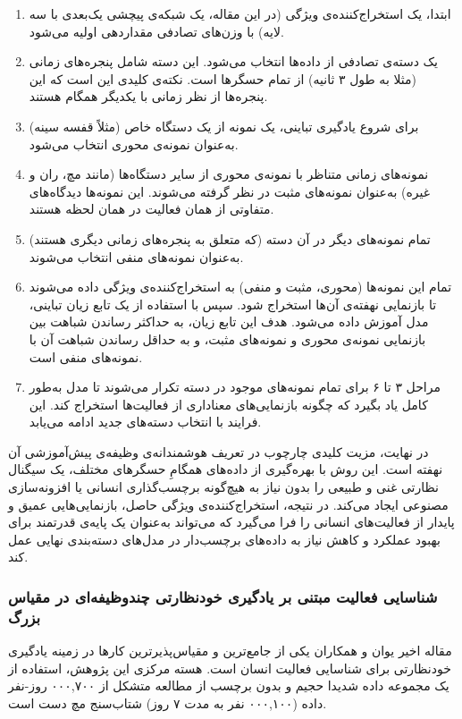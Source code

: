 \begin{enumerate}
\item ابتدا، یک استخراج‌کننده‌ی ویژگی (در این مقاله، یک شبکه‌ی پیچشی یک‌بعدی با سه لایه) با وزن‌های تصادفی مقداردهی اولیه می‌شود.
\item یک دسته‌ی تصادفی از داده‌ها انتخاب می‌شود. این دسته شامل پنجره‌های زمانی (مثلا به طول ۳ ثانیه) از تمام حسگرها است. نکته‌ی کلیدی این است که این پنجره‌ها از نظر زمانی با یکدیگر همگام هستند.
\item برای شروع یادگیری تباینی، یک نمونه از یک دستگاه خاص (مثلاً قفسه سینه) به‌عنوان نمونه‌ی محوری  انتخاب می‌شود.
\item نمونه‌های زمانی متناظر با نمونه‌ی محوری از سایر دستگاه‌ها (مانند مچ، ران و غیره) به‌عنوان نمونه‌های مثبت در نظر گرفته می‌شوند. این نمونه‌ها دیدگاه‌های متفاوتی از همان فعالیت در همان لحظه هستند.
\item تمام نمونه‌های دیگر در آن دسته (که متعلق به پنجره‌های زمانی دیگری هستند) به‌عنوان نمونه‌های منفی انتخاب می‌شوند.
\item تمام این نمونه‌ها (محوری، مثبت و منفی) به استخراج‌کننده‌ی ویژگی داده می‌شوند تا بازنمایی نهفته‌ی آن‌ها استخراج شود. سپس با استفاده از یک تابع زیان تباینی، مدل آموزش داده می‌شود. هدف این تابع زیان، به حداکثر رساندن شباهت بین بازنمایی نمونه‌ی محوری و نمونه‌های مثبت، و به حداقل رساندن شباهت آن با نمونه‌های منفی است.
\item مراحل ۳ تا ۶ برای تمام نمونه‌های موجود در دسته تکرار می‌شوند تا مدل به‌طور کامل یاد بگیرد که چگونه بازنمایی‌های معناداری از فعالیت‌ها استخراج کند. این فرایند با انتخاب دسته‌های جدید ادامه می‌یابد.
\end{enumerate}

در نهایت، مزیت کلیدی چارچوب  در تعریف هوشمندانه‌ی وظیفه‌ی پیش‌آموزشی آن نهفته است. این روش با بهره‌گیری از داده‌های همگامِ حسگرهای مختلف، یک سیگنال نظارتی غنی و طبیعی را بدون نیاز به هیچ‌گونه برچسب‌گذاری انسانی یا افزونه‌سازی مصنوعی ایجاد می‌کند. در نتیجه، استخراج‌کننده‌ی ویژگی حاصل، بازنمایی‌هایی عمیق و پایدار از فعالیت‌های انسانی را فرا می‌گیرد که می‌تواند به‌عنوان یک پایه‌ی قدرتمند برای بهبود عملکرد و کاهش نیاز به داده‌های برچسب‌دار در مدل‌های دسته‌بندی نهایی عمل کند.

\subsubsection{شناسایی فعالیت مبتنی بر یادگیری خودنظارتی چندوظیفه‌ای در مقیاس بزرگ}

مقاله اخیر یوان و همکاران \cite{yuan2024self} یکی از جامع‌ترین و مقیاس‌پذیرترین کارها در زمینه یادگیری خودنظارتی برای شناسایی فعالیت انسان است. هسته مرکزی این پژوهش، استفاده از یک مجموعه داده شدیدا حجیم و بدون برچسب از مطالعه  متشکل از ۰۰۰,۷۰۰ روز-نفر داده (۰۰۰,۱۰۰ نفر به مدت ۷ روز) شتاب‌سنج مچ دست است.


